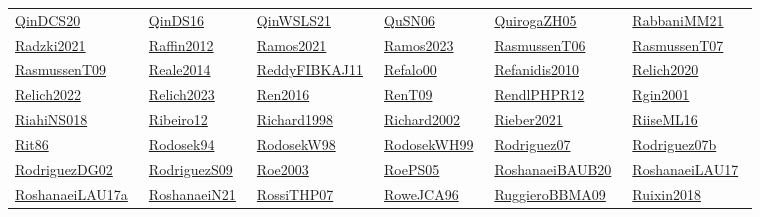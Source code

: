 \begin{longtable}{*{6}{l}}
\href{../works/QinDCS20.pdf}{QinDCS20}~\cite{QinDCS20} & \href{../works/QinDS16.pdf}{QinDS16}~\cite{QinDS16} & \href{../works/QinWSLS21.pdf}{QinWSLS21}~\cite{QinWSLS21} & \href{../works/QuSN06.pdf}{QuSN06}~\cite{QuSN06} & \href{../works/QuirogaZH05.pdf}{QuirogaZH05}~\cite{QuirogaZH05} & \href{../}{RabbaniMM21}~\cite{RabbaniMM21}\\ 
\href{../}{Radzki2021}~\cite{Radzki2021} & \href{../}{Raffin2012}~\cite{Raffin2012} & \href{../}{Ramos2021}~\cite{Ramos2021} & \href{../}{Ramos2023}~\cite{Ramos2023} & \href{../works/RasmussenT06.pdf}{RasmussenT06}~\cite{RasmussenT06} & \href{../works/RasmussenT07.pdf}{RasmussenT07}~\cite{RasmussenT07}\\ 
\href{../works/RasmussenT09.pdf}{RasmussenT09}~\cite{RasmussenT09} & \href{../}{Reale2014}~\cite{Reale2014} & \href{../works/ReddyFIBKAJ11.pdf}{ReddyFIBKAJ11}~\cite{ReddyFIBKAJ11} & \href{../works/Refalo00.pdf}{Refalo00}~\cite{Refalo00} & \href{../}{Refanidis2010}~\cite{Refanidis2010} & \href{../}{Relich2020}~\cite{Relich2020}\\ 
\href{../}{Relich2022}~\cite{Relich2022} & \href{../}{Relich2023}~\cite{Relich2023} & \href{../}{Ren2016}~\cite{Ren2016} & \href{../works/RenT09.pdf}{RenT09}~\cite{RenT09} & \href{../works/RendlPHPR12.pdf}{RendlPHPR12}~\cite{RendlPHPR12} & \href{../}{Rgin2001}~\cite{Rgin2001}\\ 
\href{../works/RiahiNS018.pdf}{RiahiNS018}~\cite{RiahiNS018} & \href{../works/Ribeiro12.pdf}{Ribeiro12}~\cite{Ribeiro12} & \href{../}{Richard1998}~\cite{Richard1998} & \href{../}{Richard2002}~\cite{Richard2002} & \href{../}{Rieber2021}~\cite{Rieber2021} & \href{../works/RiiseML16.pdf}{RiiseML16}~\cite{RiiseML16}\\ 
\href{../works/Rit86.pdf}{Rit86}~\cite{Rit86} & \href{../}{Rodosek94}~\cite{Rodosek94} & \href{../works/RodosekW98.pdf}{RodosekW98}~\cite{RodosekW98} & \href{../works/RodosekWH99.pdf}{RodosekWH99}~\cite{RodosekWH99} & \href{../works/Rodriguez07.pdf}{Rodriguez07}~\cite{Rodriguez07} & \href{../works/Rodriguez07b.pdf}{Rodriguez07b}~\cite{Rodriguez07b}\\ 
\href{../works/RodriguezDG02.pdf}{RodriguezDG02}~\cite{RodriguezDG02} & \href{../works/RodriguezS09.pdf}{RodriguezS09}~\cite{RodriguezS09} & \href{../}{Roe2003}~\cite{Roe2003} & \href{../works/RoePS05.pdf}{RoePS05}~\cite{RoePS05} & \href{../works/RoshanaeiBAUB20.pdf}{RoshanaeiBAUB20}~\cite{RoshanaeiBAUB20} & \href{../works/RoshanaeiLAU17.pdf}{RoshanaeiLAU17}~\cite{RoshanaeiLAU17}\\ 
\href{../}{RoshanaeiLAU17a}~\cite{RoshanaeiLAU17a} & \href{../works/RoshanaeiN21.pdf}{RoshanaeiN21}~\cite{RoshanaeiN21} & \href{../works/RossiTHP07.pdf}{RossiTHP07}~\cite{RossiTHP07} & \href{../works/RoweJCA96.pdf}{RoweJCA96}~\cite{RoweJCA96} & \href{../works/RuggieroBBMA09.pdf}{RuggieroBBMA09}~\cite{RuggieroBBMA09} & \href{../}{Ruixin2018}~\cite{Ruixin2018}\\ 

\end{longtable}
